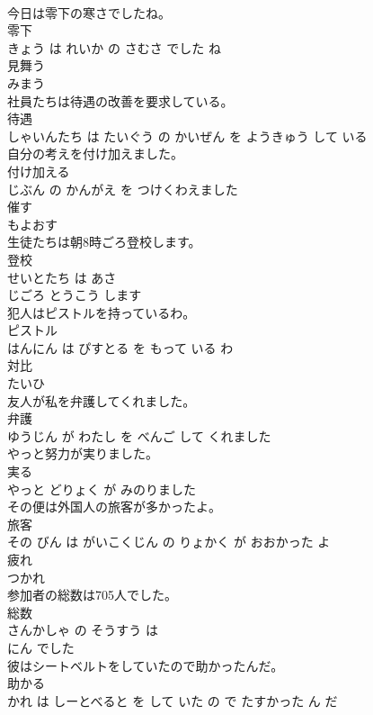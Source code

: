 \documentclass[8pt]{extreport}
\begin{document}
\begin{CJK}{UTF8}{min}
\\	今日は零下の寒さでしたね。	
\\	零下 
\\	きょう は れいか の さむさ でした ね			
\\	見舞う	
\\	みまう			
\\	社員たちは待遇の改善を要求している。	
\\	待遇 
\\	しゃいんたち は たいぐう の かいぜん を ようきゅう して いる			
\\	自分の考えを付け加えました。	
\\	付け加える 
\\	じぶん の かんがえ を つけくわえました			
\\	催す	
\\	もよおす			
\\	生徒たちは朝8時ごろ登校します。	
\\	登校 
\\	せいとたち は あさ 
\\	じごろ とうこう します			
\\	犯人はピストルを持っているわ。	
\\	ピストル 
\\	はんにん は ぴすとる を もって いる わ			
\\	対比	
\\	たいひ			
\\	友人が私を弁護してくれました。	
\\	弁護 
\\	ゆうじん が わたし を べんご して くれました			
\\	やっと努力が実りました。	
\\	実る 
\\	やっと どりょく が みのりました			
\\	その便は外国人の旅客が多かったよ。	
\\	旅客 
\\	その びん は がいこくじん の りょかく が おおかった よ			
\\	疲れ	
\\	つかれ			
\\	参加者の総数は705人でした。	
\\	総数 
\\	さんかしゃ の そうすう は 
\\	にん でした			
\\	彼はシートベルトをしていたので助かったんだ。	
\\	助かる 
\\	かれ は しーとべると を して いた の で たすかった ん だ			

\end{CJK}
\end{document}
